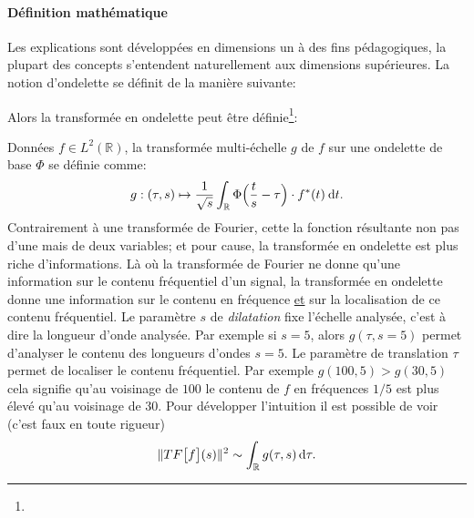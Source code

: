    \paragraph{Définition mathématique}
        Les explications sont développées en dimensions un à des fins pédagogiques, la plupart des concepts s'entendent naturellement aux dimensions supérieures. 
        La notion d'ondelette se définit de la manière suivante:
        Alors la transformée en ondelette peut être définie\footnote{}:
        \begin{definition}
            Données $f \in L^2(\mathbb R)$, la transformée multi-échelle $g$ de $f$ sur une ondelette de base $\Phi$ se définie comme:
            \begin{align}
                g: (\tau,s) \mapsto \frac{1}{\sqrt{s}}\int_{\mathbb R} \Phi\Bigl(\frac{t}{s}  - \tau\Bigr) \cdot f^*(t)\: \text{d}t.
            \end{align}
            Contrairement à une transformée de Fourier, cette la fonction résultante non pas d'une mais de deux variables; et pour cause, 
            la transformée en ondelette est plus riche d'informations. Là où la transformée de Fourier ne donne qu'une information 
            sur le contenu fréquentiel d'un signal, la transformée en ondelette donne une information sur le contenu en fréquence \underline{et}
            sur la localisation de ce contenu fréquentiel.
            Le paramètre $s$ de \textit{dilatation} fixe l'échelle analysée, c'est à dire la longueur d'onde analysée. Par exemple si $s=5$, 
            alors $g(\tau,s=5)$ permet d'analyser le contenu des longueurs d'ondes $s=5$. Le paramètre de translation $\tau$ permet de localiser 
            le contenu fréquentiel. Par exemple $g(100,5)> g(30,5)$ cela signifie qu'au voisinage de $100$ le contenu de $f$ en fréquences $1/5$
            est plus élevé qu'au voisinage de $30$. Pour développer l'intuition il est possible de voir (c'est faux en toute rigueur)
            \begin{align}
                \Vert TF\bigl[f\bigr](s) \Vert^2 \sim \int_\mathbb{R} g(\tau,s) \, \text d \tau.
            \end{align}
        \end{definition}
